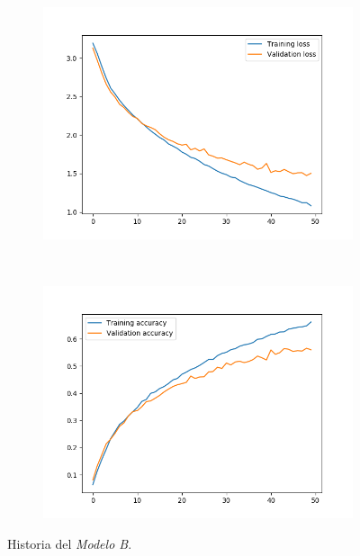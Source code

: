 \documentclass[11pt,a4paper]{article}
\begin{document}
\begin{figure}[H]
  \centering
  \begin{subfigure}{.5\textwidth}
    \includegraphics[scale=0.4]{img/deep2-drop-loss-50.png}
    \label{fig:deep2-drop-loss-50}
  \end{subfigure}%
  ~ \quad
  \begin{subfigure}{.5\textwidth}
    \includegraphics[scale=0.4]{img/deep2-drop-acc-50.png}
    \label{fig:deep2-drop-acc-50}
  \end{subfigure}
  \caption{Historia del \textit{Modelo B}.}
  \label{fig:history-deep2-drop-50}
\end{figure}
\end{document}
